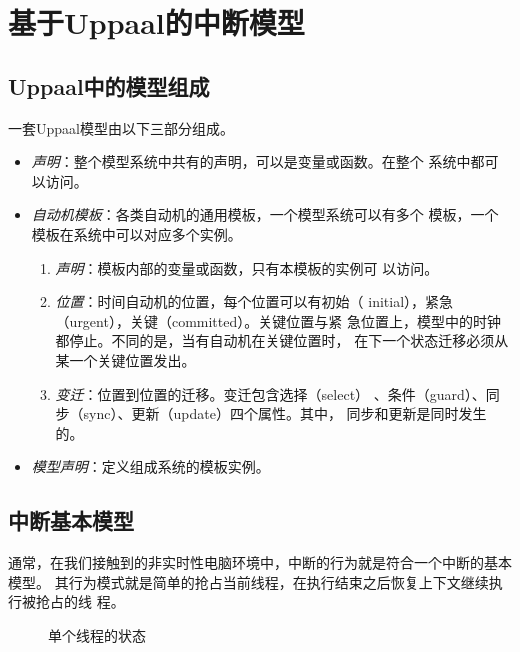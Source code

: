 
\chapter{基于Uppaal的中断模型}
\label{cha:intr}

\section{Uppaal中的模型组成}
\label{sec:model_combine}	
一套Uppaal模型由以下三部分组成。
\begin{itemize}
	\item \emph{声明}：整个模型系统中共有的声明，可以是变量或函数。在整个
	系统中都可以访问。
	\item \emph{自动机模板}：各类自动机的通用模板，一个模型系统可以有多个
	模板，一个模板在系统中可以对应多个实例。
		\begin{enumerate}[(1)]
			\item \emph{声明}：模板内部的变量或函数，只有本模板的实例可
			以访问。
			\item \emph{位置}：时间自动机的位置，每个位置可以有初始（
			initial），紧急（urgent），关键（committed）。关键位置与紧
			急位置上，模型中的时钟都停止。不同的是，当有自动机在关键位置时，
			在下一个状态迁移必须从某一个关键位置发出。
			\item \emph{变迁}：位置到位置的迁移。变迁包含选择（select）
			、条件（guard）、同步（sync）、更新（update）四个属性。其中，
			同步和更新是同时发生的。
		\end{enumerate}	
	\item \emph{模型声明}：定义组成系统的模板实例。
\end{itemize}

\section{中断基本模型}
\label{sec:basic}
通常，在我们接触到的非实时性电脑环境中，中断的行为就是符合一个中断的基本模型。
其行为模式就是简单的抢占当前线程，在执行结束之后恢复上下文继续执行被抢占的线
程。

\begin{figure}[H]
	\centering
	
	\caption{单个线程的状态}
	\label{fig:thread_state}
\end{figure}

